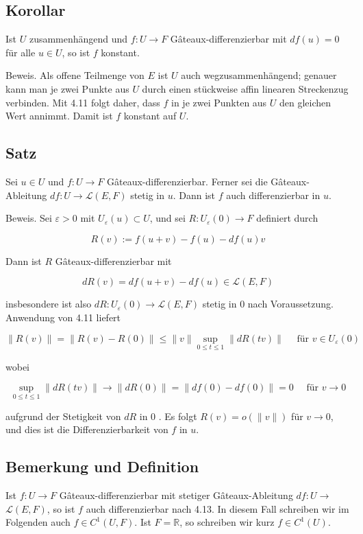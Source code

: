 \documentclass[10pt, letterpaper]{article}
\begin{document}
\subsection*{Korollar}

Ist $U$ zusammenhängend und $f: U \rightarrow F$ Gâteaux-differenzierbar mit $d f(u)=0$ für alle $u \in U$, so ist $f$ konstant.

Beweis. Als offene Teilmenge von $E$ ist $U$ auch wegzusammenhängend; genauer kann man je zwei Punkte aus $U$ durch einen stückweise affin linearen Streckenzug verbinden. Mit 4.11 folgt daher, dass $f$ in je zwei Punkten aus $U$ den gleichen Wert annimmt. Damit ist $f$ konstant auf $U$.

\subsection*{Satz}

Sei $u \in U$ und $f: U \rightarrow F$ Gâteaux-differenzierbar. Ferner sei die Gâteaux-Ableitung $d f: U \rightarrow \mathcal{L}(E, F)$ stetig in $u$. Dann ist $f$ auch differenzierbar in $u$.

Beweis. Sei $\varepsilon>0$ mit $U_{\varepsilon}(u) \subset U$, und sei $R: U_{\varepsilon}(0) \rightarrow F$ definiert durch

$$
R(v):=f(u+v)-f(u)-d f(u) v
$$

Dann ist $R$ Gâteaux-differenzierbar mit

$$
d R(v)=d f(u+v)-d f(u) \in \mathcal{L}(E, F)
$$

insbesondere ist also $d R: U_{\varepsilon}(0) \rightarrow \mathcal{L}(E, F)$ stetig in 0 nach Voraussetzung. Anwendung von 4.11 liefert

$$
\|R(v)\|=\|R(v)-R(0)\| \leq\|v\| \sup _{0 \leq t \leq 1}\|d R(t v)\| \quad \text { für } v \in U_{\varepsilon}(0)
$$

wobei

$$
\sup _{0 \leq t \leq 1}\|d R(t v)\| \rightarrow\|d R(0)\|=\|d f(0)-d f(0)\|=0 \quad \text { für } v \rightarrow 0
$$

aufgrund der Stetigkeit von $d R$ in 0 . Es folgt $R(v)=o(\|v\|)$ für $v \rightarrow 0$, und dies ist die Differenzierbarkeit von $f$ in $u$.

\subsection*{Bemerkung und Definition}

Ist $f: U \rightarrow F$ Gâteaux-differenzierbar mit stetiger Gâteaux-Ableitung $d f: U \rightarrow$ $\mathcal{L}(E, F)$, so ist $f$ auch differenzierbar nach 4.13. In diesem Fall schreiben wir im Folgenden auch $f \in C^{1}(U, F)$. Ist $F=\mathbb{R}$, so schreiben wir kurz $f \in C^{1}(U)$.
\end{document}
